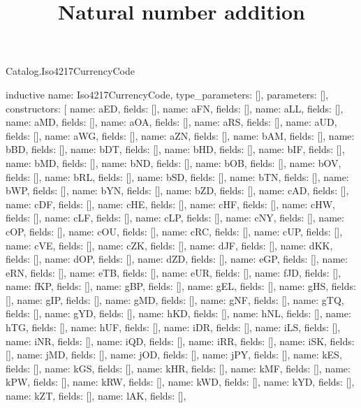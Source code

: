 \begin{lexlean}{Catalog.Iso4217CurrencyCode}
\title{Natural number addition}
\begin{semanticmodule}
inductive{
  name: Iso4217CurrencyCode,
  type_parameters: [],
  parameters: [],
  constructors: [
    {name: aED, fields: []},
    {name: aFN, fields: []},
    {name: aLL, fields: []},
    {name: aMD, fields: []},
    {name: aOA, fields: []},
    {name: aRS, fields: []},
    {name: aUD, fields: []},
    {name: aWG, fields: []},
    {name: aZN, fields: []},
    {name: bAM, fields: []},
    {name: bBD, fields: []},
    {name: bDT, fields: []},
    {name: bHD, fields: []},
    {name: bIF, fields: []},
    {name: bMD, fields: []},
    {name: bND, fields: []},
    {name: bOB, fields: []},
    {name: bOV, fields: []},
    {name: bRL, fields: []},
    {name: bSD, fields: []},
    {name: bTN, fields: []},
    {name: bWP, fields: []},
    {name: bYN, fields: []},
    {name: bZD, fields: []},
    {name: cAD, fields: []},
    {name: cDF, fields: []},
    {name: cHE, fields: []},
    {name: cHF, fields: []},
    {name: cHW, fields: []},
    {name: cLF, fields: []},
    {name: cLP, fields: []},
    {name: cNY, fields: []},
    {name: cOP, fields: []},
    {name: cOU, fields: []},
    {name: cRC, fields: []},
    {name: cUP, fields: []},
    {name: cVE, fields: []},
    {name: cZK, fields: []},
    {name: dJF, fields: []},
    {name: dKK, fields: []},
    {name: dOP, fields: []},
    {name: dZD, fields: []},
    {name: eGP, fields: []},
    {name: eRN, fields: []},
    {name: eTB, fields: []},
    {name: eUR, fields: []},
    {name: fJD, fields: []},
    {name: fKP, fields: []},
    {name: gBP, fields: []},
    {name: gEL, fields: []},
    {name: gHS, fields: []},
    {name: gIP, fields: []},
    {name: gMD, fields: []},
    {name: gNF, fields: []},
    {name: gTQ, fields: []},
    {name: gYD, fields: []},
    {name: hKD, fields: []},
    {name: hNL, fields: []},
    {name: hTG, fields: []},
    {name: hUF, fields: []},
    {name: iDR, fields: []},
    {name: iLS, fields: []},
    {name: iNR, fields: []},
    {name: iQD, fields: []},
    {name: iRR, fields: []},
    {name: iSK, fields: []},
    {name: jMD, fields: []},
    {name: jOD, fields: []},
    {name: jPY, fields: []},
    {name: kES, fields: []},
    {name: kGS, fields: []},
    {name: kHR, fields: []},
    {name: kMF, fields: []},
    {name: kPW, fields: []},
    {name: kRW, fields: []},
    {name: kWD, fields: []},
    {name: kYD, fields: []},
    {name: kZT, fields: []},
    {name: lAK, fields: []},
}
\end{semanticmodule}
\end{lexlean}
